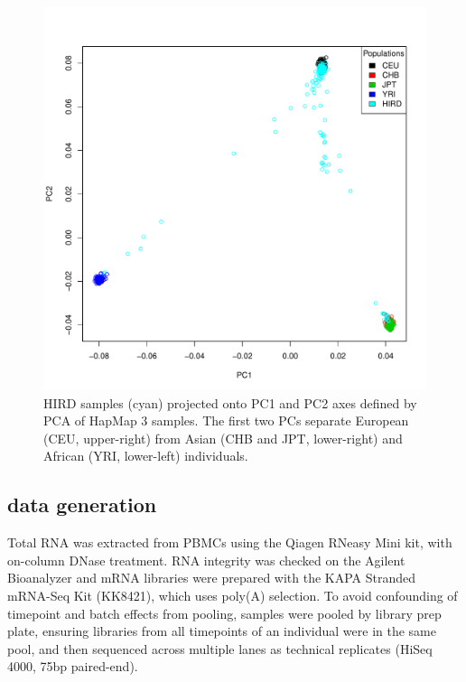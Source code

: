 \begin{figure}
    \includegraphics[width=1.0\textwidth]{mainmatter/figures/chapter_02/coreex_eQTLflu_20171204.gencall.smajor.impute_sex.qc3.pruned.hapmap_merged.flipped.pca.evec.pdf}
    \caption{\gls{HIRD} samples (cyan) projected onto \gls{PC}1 and \gls{PC}2 axes defined by \gls{PCA} of HapMap 3 samples. The first two \glspl{PC} separate European (CEU, upper-right) from Asian (CHB and JPT, lower-right) and African (YRI, lower-left) individuals.}
    \label{fig:hird_genotype_pca_withHapmap}
\end{figure}

\subsection{ data generation}

Total RNA was extracted from \glspl{PBMC} using the Qiagen RNeasy Mini kit, with on-column DNase treatment.
RNA integrity was checked on the Agilent Bioanalyzer and mRNA libraries were prepared with the KAPA Stranded mRNA-Seq Kit (KK8421), which uses poly(A) selection.
To avoid confounding of timepoint and batch effects from pooling, samples were pooled by library prep plate, ensuring libraries from all timepoints of an individual were in the same pool, and then sequenced across multiple lanes as technical replicates (HiSeq 4000, 75bp paired-end).

